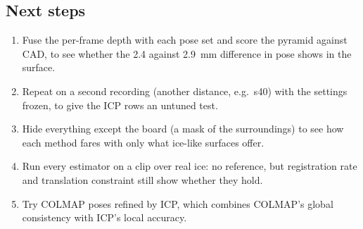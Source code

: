 \subsection{Next steps}
\begin{enumerate}
\item Fuse the per-frame depth with each pose set and score the pyramid against CAD, to see whether the 2.4 against
2.9~mm difference in pose shows in the surface.
\item Repeat on a second recording (another distance, e.g.\ s40) with the settings frozen, to give the ICP rows an
untuned test.
\item Hide everything except the board (a mask of the surroundings) to see how each method fares with only what
ice-like surfaces offer.
\item Run every estimator on a clip over real ice: no reference, but registration rate and translation
constraint still show whether they hold.
\item Try COLMAP poses refined by ICP, which combines COLMAP's global consistency with ICP's local accuracy.
\end{enumerate}
